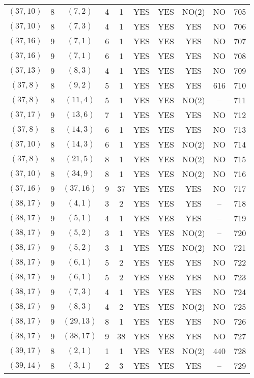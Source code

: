 \begin{longtable}{|c|c|c|c|c|c|c|c|c|c|}
$(37, 10)$ & 8 & $(7, 2)$ & 4 & 1 & YES & YES & NO(2) & NO & 705\\
$(37, 10)$ & 8 & $(7, 3)$ & 4 & 1 & YES & YES & YES & NO & 706\\
$(37, 16)$ & 9 & $(7, 1)$ & 6 & 1 & YES & YES & YES & NO & 707\\
$(37, 16)$ & 9 & $(7, 1)$ & 6 & 1 & YES & YES & YES & NO & 708\\
$(37, 13)$ & 9 & $(8, 3)$ & 4 & 1 & YES & YES & YES & NO & 709\\
$(37, 8)$ & 8 & $(9, 2)$ & 5 & 1 & YES & YES & YES & 616 & 710\\
$(37, 8)$ & 8 & $(11, 4)$ & 5 & 1 & YES & YES & NO(2) & -- & 711\\
$(37, 17)$ & 9 & $(13, 6)$ & 7 & 1 & YES & YES & YES & NO & 712\\
$(37, 8)$ & 8 & $(14, 3)$ & 6 & 1 & YES & YES & YES & NO & 713\\
$(37, 10)$ & 8 & $(14, 3)$ & 6 & 1 & YES & YES & NO(2) & NO & 714\\
$(37, 8)$ & 8 & $(21, 5)$ & 8 & 1 & YES & YES & NO(2) & NO & 715\\
$(37, 10)$ & 8 & $(34, 9)$ & 8 & 1 & YES & YES & NO(2) & NO & 716\\
$(37, 16)$ & 9 & $(37, 16)$ & 9 & 37 & YES & YES & YES & NO & 717\\
$(38, 17)$ & 9 & $(4, 1)$ & 3 & 2 & YES & YES & YES & -- & 718\\
$(38, 17)$ & 9 & $(5, 1)$ & 4 & 1 & YES & YES & YES & -- & 719\\
$(38, 17)$ & 9 & $(5, 2)$ & 3 & 1 & YES & YES & NO(2) & -- & 720\\
$(38, 17)$ & 9 & $(5, 2)$ & 3 & 1 & YES & YES & NO(2) & NO & 721\\
$(38, 17)$ & 9 & $(6, 1)$ & 5 & 2 & YES & YES & YES & NO & 722\\
$(38, 17)$ & 9 & $(6, 1)$ & 5 & 2 & YES & YES & YES & NO & 723\\
$(38, 17)$ & 9 & $(7, 3)$ & 4 & 1 & YES & YES & YES & NO & 724\\
$(38, 17)$ & 9 & $(8, 3)$ & 4 & 2 & YES & YES & NO(2) & NO & 725\\
$(38, 17)$ & 9 & $(29, 13)$ & 8 & 1 & YES & YES & YES & NO & 726\\
$(38, 17)$ & 9 & $(38, 17)$ & 9 & 38 & YES & YES & YES & NO & 727\\
$(39, 17)$ & 8 & $(2, 1)$ & 1 & 1 & YES & YES & NO(2) & 440 & 728\\
$(39, 14)$ & 8 & $(3, 1)$ & 2 & 3 & YES & YES & YES & -- & 729\\

\end{longtable}
